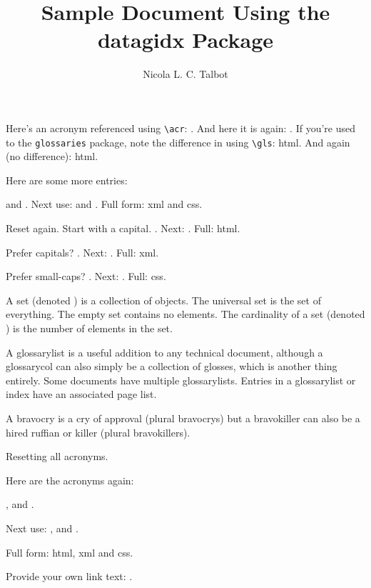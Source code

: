 \documentclass{article}
\title{Sample Document Using the datagidx Package}
\author{Nicola L. C. Talbot}
\begin{document}
\maketitle

Here's an acronym referenced using \verb|\acr|: .
And here
it is again: . If you're used to the \texttt{glossaries}
package, note the difference in using \verb|\gls|: \gls{html}.
And again (no difference): \gls{html}.

Here are some more entries:

 and .
Next use:
 and .
Full form:
\gls{xml} and \gls{css}.

Reset again. %
Start with a capital. .
Next: . Full: \Gls{html}.

Prefer capitals?
\renewcommand{\acronymfont}[1]{\MakeUppercase{#1}}%
. Next: . Full: \gls{xml}.

Prefer small-caps?
\renewcommand{\acronymfont}[1]{\textsc{#1}}%
. Next: . Full: \gls{css}.

A \gls{set} (denoted ) is a collection of objects.
The \gls{universal set} is the set of everything.
The \gls{empty set} contains no elements.
The \gls{cardinality} of a set (denoted ) is the
number of elements in the set.

A \gls{glossarylist} is a useful
addition to any technical document,
although a \gls{glossarycol} can also simply be a collection of
glosses, which is another thing entirely. Some documents have
multiple \glspl{glossarylist}. Entries in a \gls{glossarylist} or 
\gls{index} have an associated \gls{page list}. 

A \gls{bravocry} is a cry of approval (plural \glspl{bravocry}) but
a
\gls{bravokiller} can also be a hired ruffian or killer (plural
\glspl{bravokiller}).

\newpage

Resetting all acronyms.

Here are the acronyms again:

,  and .

Next use:
,  and .

Full form:
\Gls{html}, \gls{xml} and \gls{css}.

\newpage

Provide your own link text: .
\end{document}
